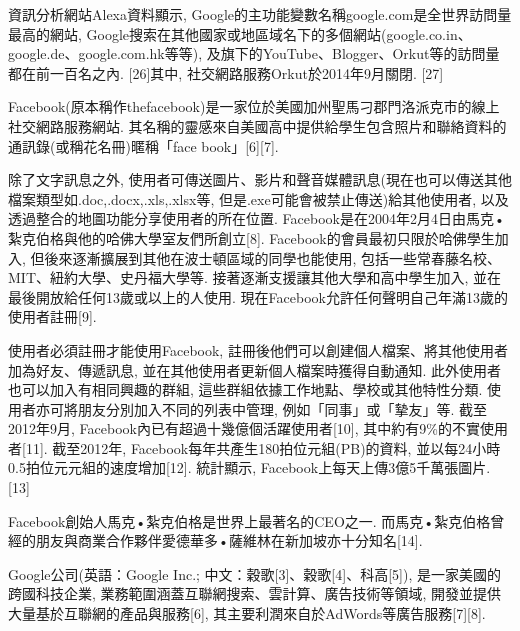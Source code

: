 資訊分析網站Alexa資料顯示, Google的主功能變數名稱google.com是全世界訪問量最高的網站, Google搜索在其他國家或地區域名下的多個網站(google.co.in、google.de、google.com.hk等等), 及旗下的YouTube、Blogger、Orkut等的訪問量都在前一百名之內. [26]其中, 社交網路服務Orkut於2014年9月關閉. [27]

Facebook(原本稱作thefacebook)是一家位於美國加州聖馬刁郡門洛派克市的線上社交網路服務網站. 其名稱的靈感來自美國高中提供給學生包含照片和聯絡資料的通訊錄(或稱花名冊)暱稱「face book」[6][7].

除了文字訊息之外, 使用者可傳送圖片、影片和聲音媒體訊息(現在也可以傳送其他檔案類型如.doc,.docx,.xls,.xlsx等, 但是.exe可能會被禁止傳送)給其他使用者, 以及透過整合的地圖功能分享使用者的所在位置. Facebook是在2004年2月4日由馬克•紮克伯格與他的哈佛大學室友們所創立[8]. Facebook的會員最初只限於哈佛學生加入, 但後來逐漸擴展到其他在波士頓區域的同學也能使用, 包括一些常春藤名校、MIT、紐約大學、史丹福大學等. 接著逐漸支援讓其他大學和高中學生加入, 並在最後開放給任何13歲或以上的人使用.  現在Facebook允許任何聲明自己年滿13歲的使用者註冊[9].

使用者必須註冊才能使用Facebook, 註冊後他們可以創建個人檔案、將其他使用者加為好友、傳遞訊息, 並在其他使用者更新個人檔案時獲得自動通知. 此外使用者也可以加入有相同興趣的群組, 這些群組依據工作地點、學校或其他特性分類. 使用者亦可將朋友分別加入不同的列表中管理, 例如「同事」或「摯友」等. 截至2012年9月, Facebook內已有超過十幾億個活躍使用者[10], 其中約有9\%的不實使用者[11]. 截至2012年, Facebook每年共產生180拍位元組(PB)的資料, 並以每24小時0.5拍位元元組的速度增加[12]. 統計顯示, Facebook上每天上傳3億5千萬張圖片. [13]

Facebook創始人馬克•紮克伯格是世界上最著名的CEO之一. 而馬克•紮克伯格曾經的朋友與商業合作夥伴愛德華多•薩維林在新加坡亦十分知名[14].

Google公司(英語：Google Inc.; 中文：穀歌[3]、穀歌[4]、科高[5]), 是一家美國的跨國科技企業, 業務範圍涵蓋互聯網搜索、雲計算、廣告技術等領域, 開發並提供大量基於互聯網的產品與服務[6], 其主要利潤來自於AdWords等廣告服務[7][8].

